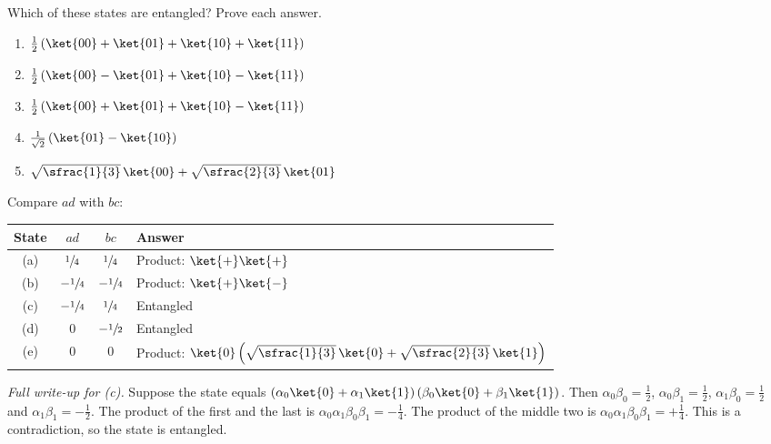 
\begin{exercisebox}
\begin{pproblem}\label{pp:five}
    Which of these states are entangled? Prove each answer.
    \begin{enumerate}[label=(\alph*)]
        \item $\frac{1}{2}\left(\ket{00} + \ket{01} + \ket{10} + \ket{11}\right)$
        \item $\frac{1}{2}\left(\ket{00} - \ket{01} + \ket{10} - \ket{11}\right)$
        \item $\frac{1}{2}\left(\ket{00} + \ket{01} + \ket{10} - \ket{11}\right)$
        \item $\frac{1}{\sqrt{2}}\left(\ket{01} - \ket{10}\right)$
        \item $\sqrt{\sfrac{1}{3}}\, \ket{00} + \sqrt{\sfrac{2}{3}}\, \ket{01}$
    \end{enumerate}
\end{pproblem}
\tcblower
\begin{wsolution}
    Compare $ad$ with $bc$:
    \begin{center}
        \begin{tabular}{cccl}
            \toprule
            State & $ad$              & $bc$              & Answer                                                                      \\ \midrule
            (a)   & $\sfrac{1}{4}$    & $\sfrac{1}{4}$    & Product: $\ket{+}\ket{+}$                                                   \\
            (b)   & $-\sfrac{1}{4}$   & $-\sfrac{1}{4}$   & Product: $\ket{+}\ket{-}$                                                   \\
            (c)   & $-\sfrac{1}{4}$   & $\sfrac{1}{4}$    & Entangled                                                                   \\
            (d)   & $0$               & $-\sfrac{1}{2}$   & Entangled                                                                   \\
            (e)   & $0$               & $0$               & Product: $\ket{0}\left(\sqrt{\sfrac{1}{3}}\,\ket{0} + \sqrt{\sfrac{2}{3}}\,\ket{1}\right)$ \\ \bottomrule
        \end{tabular}
    \end{center}

    \emph{Full write-up for (c).} Suppose the state equals
    $\left(\alpha_0\ket{0} + \alpha_1\ket{1}\right)\left(\beta_0\ket{0} + \beta_1\ket{1}\right)$.
    Then $\alpha_0\beta_0 = \frac{1}{2}$, $\alpha_0\beta_1 = \frac{1}{2}$,
    $\alpha_1\beta_0 = \frac{1}{2}$ and $\alpha_1\beta_1 = -\frac{1}{2}$. The product of the first
    and the last is $\alpha_0\alpha_1\beta_0\beta_1 = -\frac{1}{4}$. The product of the middle two
    is $\alpha_0\alpha_1\beta_0\beta_1 = +\frac{1}{4}$. This is a contradiction, so the state is
    entangled.
\end{wsolution}
\end{exercisebox}


